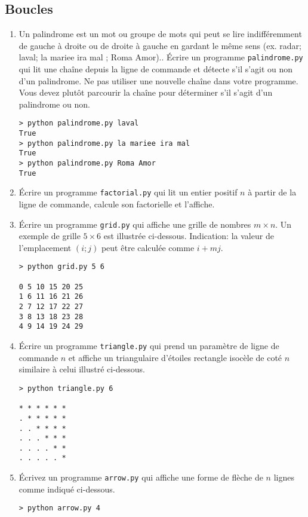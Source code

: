 \documentclass[a4paper]{article}
\begin{document}
\subsection{Boucles}
\begin{enumerate}
\item Un palindrome est un mot ou groupe de mots qui peut se lire indifféremment de gauche à droite ou de droite à gauche en gardant le même sens (ex. radar; laval; la mariee ira mal ; Roma Amor)..  Écrire un programme {\tt palindrome.py} qui lit une chaîne depuis la ligne de commande et détecte s'il s'agit ou non d'un palindrome. Ne pas utiliser une nouvelle chaîne dans votre programme. Vous devez plutôt parcourir la chaîne pour déterminer s'il s'agit d'un palindrome ou non.
\begin{verbatim}
> python palindrome.py laval
True
> python palindrome.py la mariee ira mal
True
> python palindrome.py Roma Amor
True
\end{verbatim}


\item Écrire un programme {\tt factorial.py} qui lit un entier positif $n$ à partir de la ligne de commande, calcule son
factorielle et l'affiche.
\item Écrire un programme {\tt grid.py} qui affiche une  grille de nombres $m\times  n$. Un exemple de grille $5\times  6$ est illustrée ci-dessous. Indication: la valeur de l'emplacement $(i; j)$ peut être calculée comme $i + mj$.

\begin{verbatim}
> python grid.py 5 6

0 5 10 15 20 25
1 6 11 16 21 26
2 7 12 17 22 27
3 8 13 18 23 28
4 9 14 19 24 29
\end{verbatim}

\item Écrire un programme {\tt triangle.py} qui prend un paramètre de ligne de commande $n$ et affiche un  triangulaire d'étoiles rectangle isocèle de coté $n$ similaire à celui illustré ci-dessous.

\begin{verbatim}
> python triangle.py 6

* * * * * *
. * * * * *
. . * * * *
. . . * * *
. . . . * *
. . . . . *
\end{verbatim}
\item Écrivez un programme {\tt arrow.py} qui affiche une forme de flèche de $n$ lignes comme indiqué ci-dessous.
\begin{verbatim}
> python arrow.py 4


\end{verbatim}
\end{enumerate}
\end{document}
